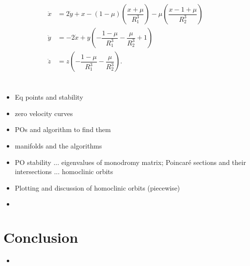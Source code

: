 \documentclass[11pt]{article} %
\begin{document}
\begin{align}
\ddot{x} &=  2\dot{y} + x - (1-\mu)\left(\dfrac{x+\mu}{R_1^3}\right) - \mu\left(\dfrac{x-1+\mu}{R_2^3}\right) \label{eomx}\\
\ddot{y} &= - 2\dot{x} + y\left(-\dfrac{1-\mu}{R_1^3} - \dfrac{\mu}{R_2^3} + 1\right) \label{eomy}\\
\ddot{z} &= z\left(-\dfrac{1 - \mu}{R_1^3} - \dfrac{\mu}{R_2^3}\right). \label{eomz}
\end{align} 

\section*{\color{red}{Periodic/Homoclinic Orbits}}
\begin{itemize}
	\item \color{red}Eq points and stability
	\item zero velocity curves
	\item POs and algorithm to find them
	\item manifolds and the algorithms
	\item PO stability ... eigenvalues of monodromy matrix; Poincaré sections and their intersections ... homoclinic orbits
	\item Plotting and discussion of homoclinic orbits (piecewise)
	\item \color{black}
\end{itemize}

\section*{Conclusion}
\begin{itemize}
	\item \color{red}{Homoclinic orbits are cool/interesting, but for spacecraft applications they aren't very useful; Heteroclinic orbits are useful fa show}\color{black}
\end{itemize}

\newpage


\end{document}
